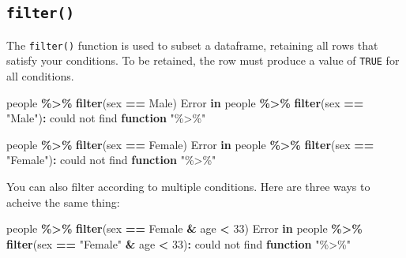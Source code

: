 \documentclass[
]{book}
\newenvironment{Shaded}{\begin{snugshade}}{\end{snugshade}}
\newcommand{\ControlFlowTok}[1]{\textcolor[rgb]{0.13,0.29,0.53}{\textbf{#1}}}
\newcommand{\DecValTok}[1]{\textcolor[rgb]{0.00,0.00,0.81}{#1}}
\newcommand{\FunctionTok}[1]{\textcolor[rgb]{0.13,0.29,0.53}{\textbf{#1}}}
\newcommand{\NormalTok}[1]{#1}
\newcommand{\SpecialCharTok}[1]{\textcolor[rgb]{0.81,0.36,0.00}{\textbf{#1}}}
\newcommand{\StringTok}[1]{\textcolor[rgb]{0.31,0.60,0.02}{#1}}
\begin{document}
\subsection*{\texorpdfstring{\texttt{filter()}}{filter()}}\label{filter}

The \texttt{filter()} function is used to subset a dataframe, retaining all rows that satisfy your conditions. To be retained, the row must produce a value of \texttt{TRUE} for all conditions.

\begin{Shaded}
\begin{Highlighting}[]
\NormalTok{people }\SpecialCharTok{\%\textgreater{}\%} \FunctionTok{filter}\NormalTok{(sex }\SpecialCharTok{==} \StringTok{\textquotesingle{}Male\textquotesingle{}}\NormalTok{)}
\NormalTok{Error }\ControlFlowTok{in}\NormalTok{ people }\SpecialCharTok{\%\textgreater{}\%} \FunctionTok{filter}\NormalTok{(sex }\SpecialCharTok{==} \StringTok{"Male"}\NormalTok{)}\SpecialCharTok{:}\NormalTok{ could not find }\ControlFlowTok{function} \StringTok{"\%\textgreater{}\%"}
\end{Highlighting}
\end{Shaded}

\begin{Shaded}
\begin{Highlighting}[]
\NormalTok{people }\SpecialCharTok{\%\textgreater{}\%} \FunctionTok{filter}\NormalTok{(sex }\SpecialCharTok{==} \StringTok{\textquotesingle{}Female\textquotesingle{}}\NormalTok{)}
\NormalTok{Error }\ControlFlowTok{in}\NormalTok{ people }\SpecialCharTok{\%\textgreater{}\%} \FunctionTok{filter}\NormalTok{(sex }\SpecialCharTok{==} \StringTok{"Female"}\NormalTok{)}\SpecialCharTok{:}\NormalTok{ could not find }\ControlFlowTok{function} \StringTok{"\%\textgreater{}\%"}
\end{Highlighting}
\end{Shaded}

You can also filter according to multiple conditions. Here are three ways to acheive the same thing:

\begin{Shaded}
\begin{Highlighting}[]
\NormalTok{people }\SpecialCharTok{\%\textgreater{}\%} \FunctionTok{filter}\NormalTok{(sex }\SpecialCharTok{==} \StringTok{\textquotesingle{}Female\textquotesingle{}} \SpecialCharTok{\&}\NormalTok{ age }\SpecialCharTok{\textless{}} \DecValTok{33}\NormalTok{)}
\NormalTok{Error }\ControlFlowTok{in}\NormalTok{ people }\SpecialCharTok{\%\textgreater{}\%} \FunctionTok{filter}\NormalTok{(sex }\SpecialCharTok{==} \StringTok{"Female"} \SpecialCharTok{\&}\NormalTok{ age }\SpecialCharTok{\textless{}} \DecValTok{33}\NormalTok{)}\SpecialCharTok{:}\NormalTok{ could not find }\ControlFlowTok{function} \StringTok{"\%\textgreater{}\%"}
\end{Highlighting}
\end{Shaded}
\end{document}
